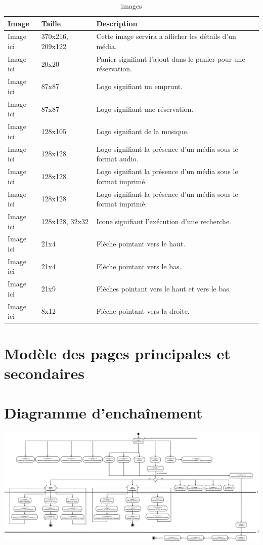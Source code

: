 \documentclass[letter, 10pt]{report}
\begin{document}
\begin{table}[h!]
	\caption{images}
	\begin{center}
		\begin{tabular}{|l|l|p{5cm}|}
		\hline
		Image 		& Taille 			& Description \\ \hline
		Image ici 	& 370x216, 209x122 	& Cette image servira a afficher les détails d'un média. \\ \hline
		Image ici 	& 20x20 			& Panier signifiant l'ajout dans le panier pour une réservation. \\ \hline
		Image ici 	& 87x87 			& Logo signifiant un emprunt. \\ \hline
		Image ici 	& 87x87 			& Logo signifiant une réservation. \\ \hline
		Image ici 	& 128x105 			& Logo signifiant de la musique. \\ \hline
		Image ici 	& 128x128 			& Logo signifiant la présence d'un média sous le format audio. \\ \hline
		Image ici 	& 128x128 			& Logo signifiant la présence d'un média sous le format imprimé. \\ \hline
		Image ici 	& 128x128 			& Logo signifiant la présence d'un média sous le format imprimé. \\ \hline
		Image ici 	& 128x128, 32x32 	& Icone signifiant l'exécution d'une recherche. \\ \hline
		Image ici 	& 21x4 				& Flèche pointant vers le haut. \\ \hline
		Image ici 	& 21x4 				& Flèche pointant vers le bas. \\ \hline
		Image ici 	& 21x9 				& Flèches pointant vers le haut et vers le bas. \\ \hline
		Image ici 	& 8x12 				& Flèche pointant vers la droite. \\ \hline
		\end{tabular}
	\end{center}
\end{table}

\section{Modèle des pages principales et secondaires}


\section{Diagramme d'enchaînement}
\includegraphics[scale=0.145]{diagrammeEnchainement.png}
\end{document}
